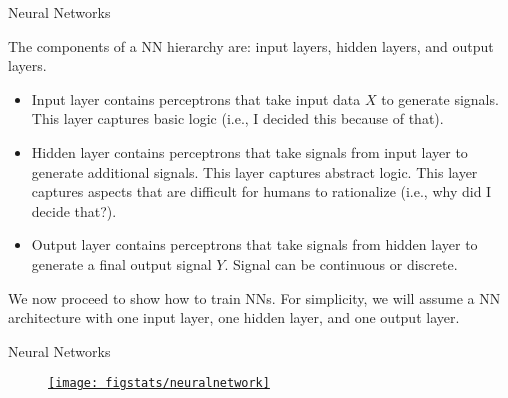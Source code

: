 \documentclass[9pt]{beamer}
\begin{document}

\begin{frame}{Neural Networks}

The components of a NN hierarchy are: input layers,  hidden layers, and output layers.
\begin{block}{}
\begin{itemize}
   \setlength{\itemsep}{10pt}
\item Input layer contains perceptrons that take input data $X$ to generate signals. This layer captures basic logic (i.e., I decided  this because of that). 
\item Hidden layer contains perceptrons that take signals from input layer to generate additional signals. This layer captures abstract logic. This layer captures aspects that are difficult for humans to rationalize (i.e., why did I decide that?). 
\item Output layer contains perceptrons that take signals from hidden layer to generate a final output signal $Y$. Signal can be continuous or discrete. 
\end{itemize}
\end{block}
We now proceed to show how to train NNs. For simplicity, we will assume a NN architecture with one input layer, one hidden layer, and one output layer. 

\end{frame}


\begin{frame}{Neural Networks}

\begin{figure}[!htb]
    \centering
	\href{https://www.neuraldesigner.com/learning/tutorials/neural-network}{\texttt{[image: figstats/neuralnetwork]}}
\end{figure}

\end{frame}

\end{document}

